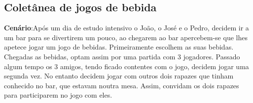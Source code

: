 \documentclass{article}
\begin{document}
\subsection*{Coletânea de jogos de bebida}
\textbf{Cenário}:Após um dia de estudo intensivo o João, o José e o Pedro, decidem ir a um bar para se divertirem um pouco, ao chegarem ao bar apercebem-se que lhes apetece jogar um jogo de bebidas. Primeiramente escolhem as suas bebidas. Chegadas as bebidas, optam assim por uma partida com 3 jogadores. 
Passado algum tempo os 3 amigos, tendo ficado contentes com o jogo, decidem jogar uma segunda vez. No entanto decidem jogar com outros dois rapazes que tinham conhecido no bar, que estavam noutra mesa. Assim, convidam os dois rapazes para participarem no jogo com eles. 
\end{document}
